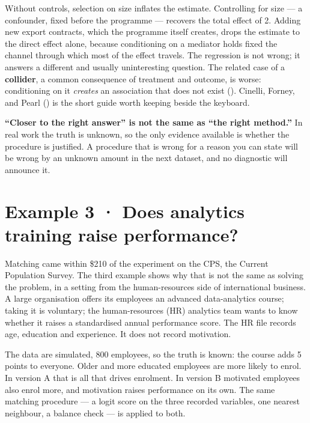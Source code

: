 \documentclass[
  letterpaper,
  10pt,
  twoside,
  openright,
  numbers=noenddot,
  chapterprefix=true]{scrbook}
\begin{document}
Without controls, selection on size inflates the estimate. Controlling
for size --- a confounder, fixed before the programme --- recovers the
total effect of 2. Adding new export contracts, which the programme
itself creates, drops the estimate to the direct effect alone, because
conditioning on a mediator holds fixed the channel through which most of
the effect travels. The regression is not wrong; it answers a different
and usually uninteresting question. The related case of a
\textbf{collider}, a common consequence of treatment and outcome, is
worse: conditioning on it \emph{creates} an association that does not
exist (). Cinelli,
Forney, and Pearl () is the short guide
worth keeping beside the keyboard.

\begin{qmibwarn}

\textbf{``Closer to the right answer'' is not the same as ``the right
method.''} In real work the truth is unknown, so the only evidence
available is whether the procedure is justified. A procedure that is
wrong for a reason you can state will be wrong by an unknown amount in
the next dataset, and no diagnostic will announce it.

\end{qmibwarn}

\section{Example 3 · Does analytics training raise
performance?}\label{example-3-does-analytics-training-raise-performance}

Matching came within \$210 of the experiment on the CPS, the Current
Population Survey. The third example shows why that is not the same as
solving the problem, in a setting from the human-resources side of
international business. A large organisation offers its employees an
advanced data-analytics course; taking it is voluntary; the
human-resources (HR) analytics team wants to know whether it raises a
standardised annual performance score. The HR file records age,
education and experience. It does not record motivation.

The data are simulated, 800 employees, so the truth is known: the course
adds 5 points to everyone. Older and more educated employees are more
likely to enrol. In version A that is all that drives enrolment. In
version B motivated employees also enrol more, and motivation raises
performance on its own. The same matching procedure --- a logit score on
the three recorded variables, one nearest neighbour, a balance check ---
is applied to both.
\end{document}
